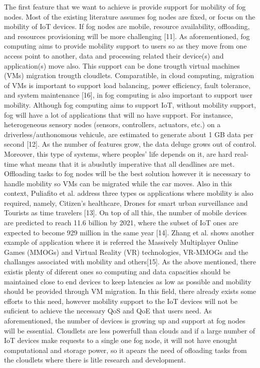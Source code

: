 \noindent\tab The first feature that we want to achieve is provide support for mobility of fog nodes. Most of the existing literature assumes fog nodes are fixed, or focus on the mobility of IoT devices. If fog nodes are mobile, resource availability, offloading, and resources provisioning will be more challenging [11]. As aforementioned, fog computing aims to provide mobility support to users so as they move from one access point to another, data and processing related their device(s) and application(s) move also. This support can be done trougth virtual machines (VMs) migration trougth cloudlets. Comparatible, in cloud computing, migration of VMs is important to support load balancing, power efficiency, fault tolerance, and system maintenance [16], in fog computing is also important to support user mobility. Although fog computing aims to support IoT, without mobility support, fog will have a lot of applications that will no have support. For instansce, heterogeneous sensory nodes (sensors, controllers, actuators, etc.) on a driverless/authonomous vehicule, are estimated to generate about 1 GB data per second [12]. As the number of features grow, the data deluge grows out of control. Moreover, this type of systems, where peoples' life depends on it, are hard real-time what means that it is abuslutly imperative that all deadlines are met. Offloading tasks to fog nodes will be the best solution however it is necessary to handle mobility so VMs can be migrated while the car moves. Also in this context, Puliafito et al. address three types os applications where mobility is also required, namely, Citizen's healthcare, Drones for smart urban surveillance and Tourists as time travelers [13]. On top of all this, the number of mobile devices are predicted to reach 11.6 billion by 2021, where the subset of IoT ones are expected to become 929 million in the same year [14]. Zhang et al. shows another example of application where it is referred the Massively Multiplayer Online Games
(MMOGs) and Virtual Reality (VR) technologies, VR-MMOGs and the challanges associated with mobility and others[15]. As the above mentioned, there existis plenty of diferent ones so computing and data capacities should be maintained close to end devices to keep latencies as low as possible and mobility should be provided through VM migration. In this field, there already exists some efforts to this need, however mobility support to the IoT devices will not be suficient to achieve the necessary QoS and QoE that users need. As aforementioned, the number of devices is growing up and support at fog nodes will be essential. Cloudlets are less powerfull than clouds and if a large number of IoT devices make requests to a single one fog node, it will not have enought computational and storage power, so it apears the need of ofloading tasks from the cloudlets where there is litle research and development.\\
